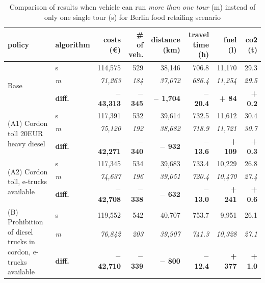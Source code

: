 \begin{table}[b]
\vspace{-3mm} 
\caption{Comparison of results when vehicle can run \textit{more than one tour} (m) instead of only one single tour (s) for Berlin food retailing scenario}
\begin{tabular*}{\hsize}{@{\extracolsep{\fill}}llrrrrrr@{}}
\toprule
policy &  algorithm & costs (\euro) & \# of veh. & distance (km) & travel time (h) & fuel (l) & \gls{co2}  (t)\\
\midrule
\multirow{ 3}{150pt}{Base} & s &  114,575 &  529 & 38,146 & 706.8 & 11,170 & 29.3 \\
& \textit{m} & \textit{71,263} & \textit{184} & \textit{37,072} & \textit{686.4} & \textit{11,254} & \textit{29.5 }\\ 
& \textbf{diff.} & \textbf{ $-$ 43,313} & \textbf{ $-$ 345} &  \textbf{$-$ 1,704} &  \textbf{$-$ 20.4} & \textbf{+ 84} & \textbf{+ 0.2}\\ \hline
 
\multirow{ 3}{150pt}{(A1) Cordon toll 20EUR heavy diesel}  & s &  117,391 &  532 & 39,614 & 732.5 & 11,612 & 30.4\\
& \textit{m} &  \textit{75,120} & \textit{192} & \textit{38,682} & \textit{718.9} & \textit{11,721} & \textit{30.7} \\ 
& \textbf{diff.} & \textbf{$-$ 42,271} & \textbf{$-$ 340} &  \textbf{$-$ 932} &  \textbf{$-$ 13.6} &  \textbf{+ 109} & \textbf{+ 0.3} \\ \hline

\multirow{ 3}{150pt}{(A2) Cordon toll, e-trucks available} & s &  117,345 &  534 & 39,683 & 733.4 & 10,229 & 26.8\\
& \textit{m} & \textit{ 74,637} & \textit{196} & \textit{39,051} & \textit{720.4} & \textit{10,470} & \textit{27.4}\\ 
& \textbf{diff.} & \textbf{ $-$ 42,708} & \textbf{$-$ 338} &  \textbf{$-$ 632} &  \textbf{$-$ 13.0} & \textbf{+ 241} & \textbf{+ 0.6}\\ \hline

\multirow{ 3}{150pt}{(B) Prohibition of diesel trucks in cordon, e-trucks available} & s & 119,552 &  542 & 40,707 & 753.7 & 9,951 & 26.1\\
& \textit{m} & \textit{76,842} & \textit{203} & \textit{39,907} & \textit{741.3} & \textit{10,328} & \textit{27.1}\\
& \textbf{diff.} & \textbf{$-$ 42,710} & \textbf{$-$ 339} &  \textbf{$-$ 800} &  \textbf{$-$ 12.4} & \textbf{+ 377} & \textbf{+ 1.0}\\ \hline


\end{tabular*}
\end{table}
